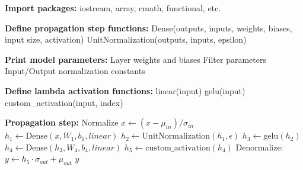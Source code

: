 \documentclass[preprint,12pt, a4paper]{elsarticle}
\begin{document}
\begin{algorithm}[h]
\caption{Example of a code-generated MLP}
\begingroup
\makeatletter
\renewcommand{\alglinenumber}[1]{\makebox[1.5em][r]{\scriptsize #1}\hspace{1em}}
\makeatother

\begin{algorithmic}[1]
\vspace{0.5\baselineskip}
\State \textbf{Import packages:} iostream, array, cmath, functional, etc.

\vspace{0.5em}
\State \textbf{Define propagation step functions:}
\State \hspace{1em} Dense(outputs, inputs, weights, biases, input size, activation)
\State \hspace{1em} UnitNormalization(outputs, inputs, epsilon)

\vspace{0.5em}
    \State \textbf{Print model parameters:}
    \State \hspace{1em} Layer weights and biases
    \State \hspace{1em} Filter parameters
    \State \hspace{1em} Input/Output normalization constants

    \vspace{0.5em}
    \State \textbf{Define lambda activation functions:}
    \State \hspace{1em} linear(input)
    \State \hspace{1em} gelu(input)
    \State \hspace{1em} custom\_activation(input, index)

    \vspace{0.5em}
    \State \textbf{Propagation step:}
    \State \hspace{1em} Normalize $x \leftarrow (x - \mu_{in}) / \sigma_{in}$
    \State \hspace{1em} $h_1 \leftarrow \text{Dense}(x, W_1, b_1, linear)$
    \State \hspace{1em} $h_2 \leftarrow \text{UnitNormalization}(h_1, \epsilon)$
    \State \hspace{1em} $h_3 \leftarrow \text{gelu}(h_2)$
    \State \hspace{1em} $h_4 \leftarrow \text{Dense}(h_3, W_4, b_4, linear)$
    \State \hspace{1em} $h_5 \leftarrow \text{custom\_activation}(h_4)$
    \State \hspace{1em} Denormalize: $y \leftarrow h_5 \cdot \sigma_{out} + \mu_{out}$
    \State \Return $y$
\EndFunction
\vspace{0.5\baselineskip}
\end{algorithmic}
\endgroup
\label{alg:mlp_structure_example}
\end{algorithm}
\end{document}
